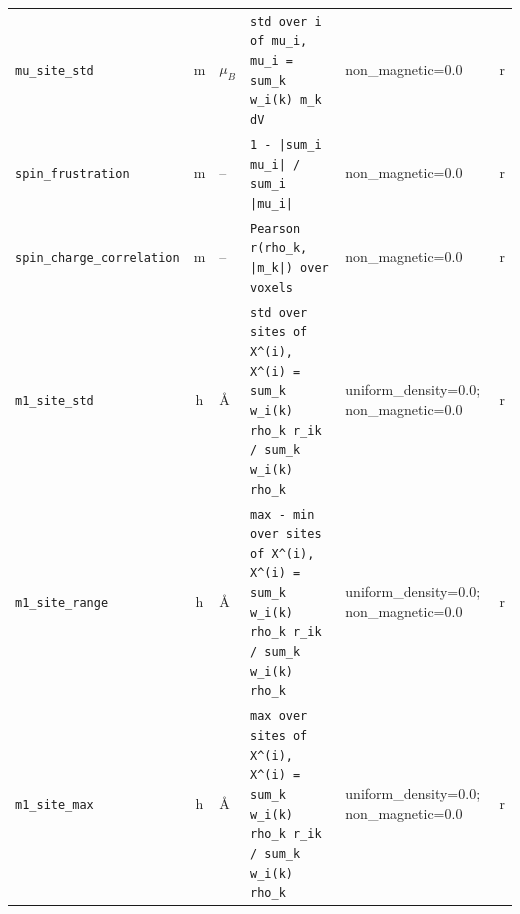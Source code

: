 \begin{table}[p]
\begin{tabular}{p{3.3cm}cp{1.4cm}p{6.6cm}p{2.3cm}c}
\texttt{mu\_site\_std} & m & $\mu_B$ & \texttt{std over i of mu\_i,  mu\_i = sum\_k w\_i(k) m\_k dV} & non\_magnetic=0.0 & r \\
\texttt{spin\_frustration} & m & -- & \texttt{1 - |sum\_i mu\_i| / sum\_i |mu\_i|} & non\_magnetic=0.0 & r \\
\texttt{spin\_charge\_correlation} & m & -- & \texttt{Pearson r(rho\_k, |m\_k|) over voxels} & non\_magnetic=0.0 & r \\
\texttt{m1\_site\_std} & h & \AA & \texttt{std over sites of X\^{}(i),  X\^{}(i) = sum\_k w\_i(k) rho\_k r\_ik / sum\_k w\_i(k) rho\_k} & uniform\_density=0.0; non\_magnetic=0.0 & r \\
\texttt{m1\_site\_range} & h & \AA & \texttt{max - min over sites of X\^{}(i),  X\^{}(i) = sum\_k w\_i(k) rho\_k r\_ik / sum\_k w\_i(k) rho\_k} & uniform\_density=0.0; non\_magnetic=0.0 & r \\
\texttt{m1\_site\_max} & h & \AA & \texttt{max over sites of X\^{}(i),  X\^{}(i) = sum\_k w\_i(k) rho\_k r\_ik / sum\_k w\_i(k) rho\_k} & uniform\_density=0.0; non\_magnetic=0.0 & r \\
\bottomrule
\end{tabular}
\end{table}

